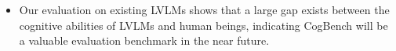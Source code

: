 \begin{itemize}
    
	\item 
Our evaluation on existing LVLMs shows that a large gap exists between the cognitive abilities of LVLMs and human beings, indicating CogBench will be a valuable evaluation benchmark in the near future.
	

\end{itemize}

